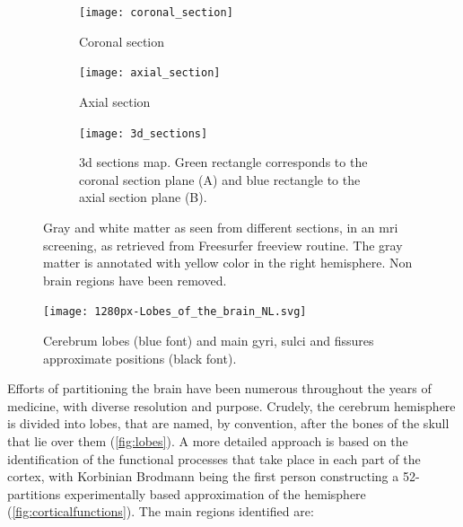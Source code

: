 \begin{figure}[H]
	\centering
	\begin{subfigure}{0.475\linewidth}
		
		\centering
		\texttt{[image: coronal\_section]}
		\caption{Coronal section}
		\label{fig:coronal}
		
	\end{subfigure}
	\hfill
	\begin{subfigure}{0.475\linewidth}
		
		\centering
		\texttt{[image: axial\_section]}
		\caption{Axial section}
		\label{fig:axial}
	\end{subfigure}
	\vfill
	\begin{subfigure}{0.475\linewidth}
		
		\centering
		\texttt{[image: 3d\_sections]}
		\caption{\Ac{3d} sections map. Green rectangle corresponds to the coronal section plane (A) and
			blue rectangle to the axial section plane (B).}
	\end{subfigure}
	\caption[\Ac{mri} screening of gray and white matter]{Gray and white matter as seen from different sections, in an \ac{mri} screening, as retrieved from Freesurfer freeview routine. The gray matter is annotated with yellow color in the right hemisphere. Non brain regions have been removed.}
	\label{fig:cerebissection}
\end{figure}



\begin{figure}[H]
	\centering
	\texttt{[image: 1280px-Lobes\_of\_the\_brain\_NL.svg]}
	\caption[A crude cerebrum partitioning]{Cerebrum lobes (blue font) and main gyri, sulci and fissures approximate positions (black font).}
	\label{fig:lobes}
\end{figure}

Efforts of partitioning the brain have been numerous throughout the years of medicine, with diverse resolution and purpose. Crudely, the cerebrum hemisphere is divided into lobes, that are named, by convention, after the bones of the skull that lie over them (\autoref{fig:lobes}).  A more detailed approach is based on the identification of the functional processes that take place in each part of the cortex, with Korbinian Brodmann being the first person constructing a 52-partitions experimentally based approximation of the hemisphere \cite{Brodmann1909} (\autoref{fig:corticalfunctions}). The main regions identified are:

